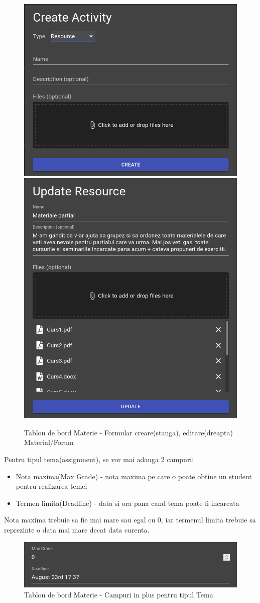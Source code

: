 \documentclass[12pt, a4paper, oneside, romanian]{teza-upb}
\begin{document}
\begin{figure}[H]
\centering
\includegraphics*[width=0.45\columnwidth]{tablou-de-bord-materie-formular-creare-material}
\includegraphics*[width=0.45\columnwidth]{tablou-de-bord-materie-formular-editare-material}
\caption{Tablou de bord Materie - Formular creare(stanga), editare(dreapta) Material/Forum}
\label{tablou-de-bord-materie-formular-material}
\end{figure}

Pentru tipul tema(assignment), se vor mai adauga 2 campuri:
\begin{itemize}
	\item Nota maxima(Max Grade) - nota maxima pe care o poate obtine un student pentru realizarea temei
	\item Termen limita(Deadline) - data si ora pana cand tema poate fi incarcata
\end{itemize}
Nota maxima trebuie sa fie mai mare sau egal cu 0, iar termenul limita trebuie sa reprezinte o data mai mare decat data curenta.

\begin{figure}[H]
\centering
\includegraphics*[width=0.8\columnwidth]{tablou-de-bord-materie-campuri-tema}
\caption{Tablou de bord Materie - Campuri in plus pentru tipul Tema}
\label{tablou-de-bord-materie-campuri-tema}
\end{figure}
\end{document}
